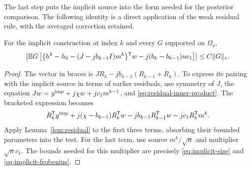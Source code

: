 The last step puts the implicit source into the form needed for the
posterior comparison. The following identity is a direct application of
the weak residual rule, with the averaged correction retained.

\begin{lemma}\label{lem:terminal-residual}
For the implicit construction at index $k$ and every $G$ supported on
$\Omega_\rho$,
\begin{equation}
 \left|\mathbb E G\left[
 \{h^k-h_0-(J-jb_{k-1}I)m^k\}^{\mathsf T}w
                   -j(b_k-b_{k-1})n c_1\right]\right|
       \leq C\lVert G\rVert_*.
 \label{eq:terminal-residual}
\end{equation}
\end{lemma}

\begin{proof}
The vector in braces is $JR_k-jb_{k-1}(R_{k-1}+R_k)$.
To express its pairing with the implicit source in terms of earlier
residuals, use symmetry of $J$, the equation
$Jw=y^{\rm imp}+j\chi w+jc_1m^{k-1}$, and
\eqref{eq:residual-inner-product}. The bracketed expression becomes
\[
 R_k^{\mathsf T}y^{\rm imp}
   +j(\chi-b_{k-1})R_k^{\mathsf T}w
   -jb_{k-1}R_{k-1}^{\mathsf T}w
   -jc_1R_k^{\mathsf T}m^k.
\]
Apply Lemma~\ref{lem:residual} to the first three terms, absorbing their
bounded parameters into the test. For the last term, use source
$m^k/\sqrt n$ and multiplier $\sqrt n c_1$. The bounds needed for this
multiplier are precisely \eqref{eq:implicit-size} and
\eqref{eq:implicit-frobenius}.
\end{proof}

